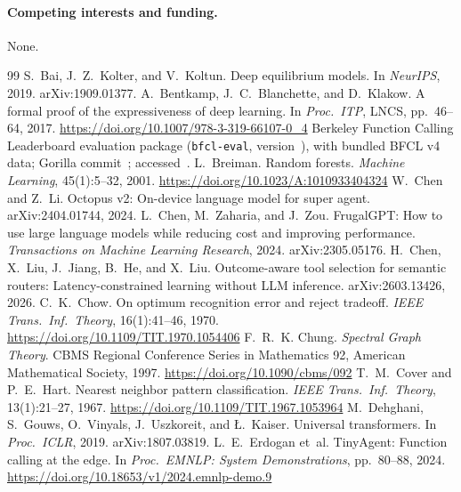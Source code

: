 \documentclass[10pt]{article}
\begin{document}
\paragraph{Competing interests and funding.} None.

\begin{thebibliography}{99}\small
{} S.~Bai, J.~Z.~Kolter, and V.~Koltun. Deep equilibrium models. In \emph{NeurIPS}, 2019. arXiv:1909.01377.
 A.~Bentkamp, J.~C.~Blanchette, and D.~Klakow. A formal proof of the expressiveness of deep learning. In \emph{Proc.\ ITP}, LNCS, pp.~46--64, 2017. \url{https://doi.org/10.1007/978-3-319-66107-0_4}
 Berkeley Function Calling Leaderboard evaluation package (\texttt{bfcl-eval}, version~\numBfclEvalVersion), with bundled BFCL v4 data; Gorilla commit~\numBfclGorillaCommit{}; accessed~\numBfclEvalAccess{}.
 L.~Breiman. Random forests. \emph{Machine Learning}, 45(1):5--32, 2001. \url{https://doi.org/10.1023/A:1010933404324}
 W.~Chen and Z.~Li. Octopus v2: On-device language model for super agent. arXiv:2404.01744, 2024.
 L.~Chen, M.~Zaharia, and J.~Zou. FrugalGPT: How to use large language models while reducing cost and improving performance. \emph{Transactions on Machine Learning Research}, 2024. arXiv:2305.05176.
 H.~Chen, X.~Liu, J.~Jiang, B.~He, and X.~Liu. Outcome-aware tool selection for semantic routers: Latency-constrained learning without LLM inference. arXiv:2603.13426, 2026.
 C.~K.~Chow. On optimum recognition error and reject tradeoff. \emph{IEEE Trans.\ Inf.\ Theory}, 16(1):41--46, 1970. \url{https://doi.org/10.1109/TIT.1970.1054406}
 F.~R.~K. Chung. \emph{Spectral Graph Theory}. CBMS Regional Conference Series in Mathematics 92, American Mathematical Society, 1997. \url{https://doi.org/10.1090/cbms/092}
 T.~M.~Cover and P.~E.~Hart. Nearest neighbor pattern classification. \emph{IEEE Trans.\ Inf.\ Theory}, 13(1):21--27, 1967. \url{https://doi.org/10.1109/TIT.1967.1053964}
 M.~Dehghani, S.~Gouws, O.~Vinyals, J.~Uszkoreit, and {\L}.~Kaiser. Universal transformers. In \emph{Proc.\ ICLR}, 2019. arXiv:1807.03819.
 L.~E.~Erdogan et~al. TinyAgent: Function calling at the edge. In \emph{Proc.\ EMNLP: System Demonstrations}, pp.~80--88, 2024. \url{https://doi.org/10.18653/v1/2024.emnlp-demo.9}

\end{thebibliography}
\end{document}
